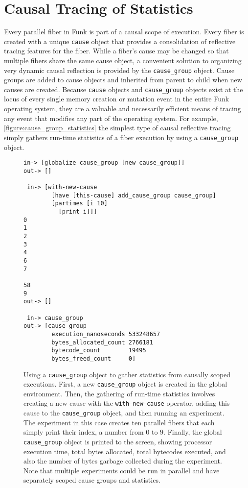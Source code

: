 \section{Causal Tracing of Statistics}

Every parallel fiber in Funk is part of a causal scope of execution.
Every fiber is created with a unique {\tt{cause}} object that provides
a consolidation of reflective tracing features for the fiber.  While a
fiber's cause may be changed so that multiple fibers share the same
cause object, a convenient solution to organizing very dynamic causal
reflection is provided by the {\tt{cause\_group}} object.  Cause
groups are added to cause objects and inherited from parent to child
when new causes are created.  Because {\tt{cause}} objects and
{\tt{cause\_group}} objects exist at the locus of every single memory
creation or mutation event in the entire Funk operating system, they
are a valuable and necessarily efficient means of tracing any event
that modifies any part of the operating system.  For example,
{\mbox{\autoref{figure:cause_group_statistics}}} the simplest type of
causal reflective tracing simply gathers run-time statistics of a
fiber execution by using a {\tt{cause\_group}} object.
\begin{figure}[h]
\centering
{\small
\begin{Verbatim}[frame=single]
 in-> [globalize cause_group [new cause_group]]
out-> []

 in-> [with-new-cause
        [have [this-cause] add_cause_group cause_group]
        [partimes [i 10]
          [print i]]]
0
1
2
3
4
6
7

58
9
out-> []

 in-> cause_group
out-> [cause_group
        execution_nanoseconds 533248657
        bytes_allocated_count 2766181
        bytecode_count        19495
        bytes_freed_count     0]
\end{Verbatim}
}
\caption[Using a {\tt{cause\_group}} object to gather statistics from
  causally scoped executions.]{Using a {\tt{cause\_group}} object to
  gather statistics from causally scoped executions.  First, a new
  {\tt{cause\_group}} object is created in the global environment.
  Then, the gathering of run-time statistics involves creating a new
  cause with the {\tt{with-new-cause}} operator, adding this cause to
  the {\tt{cause\_group}} object, and then running an experiment.  The
  experiment in this case creates ten parallel fibers that each simply
  print their index, a number from $0$ to $9$.  Finally, the global
  {\tt{cause\_group}} object is printed to the screen, showing
  processor execution time, total bytes allocated, total bytecodes
  executed, and also the number of bytes garbage collected during the
  experiment.  Note that multiple experiments could be run in parallel
  and have separately scoped cause groups and statistics.}
\label{figure:cause_group_statistics}
\end{figure}

